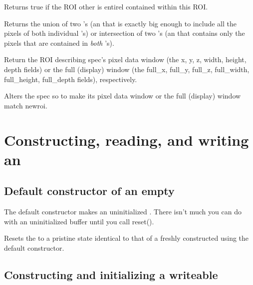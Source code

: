 \NEW %
Returns {\cf true} if the ROI {\cf other} is entirel contained within
this ROI.
\apiend

Returns the union of two \ROI's (an \ROI that is exactly big enough
to include all the pixels of both individual \ROI's) or intersection
of two \ROI's (an \ROI that contains only the pixels that are contained
in \emph{both} \ROI's).
\apiend

Return the ROI describing {\cf spec}'s pixel data window (the {\cf x, y, z,
width, height, depth} fields)
or the full (display) window (the {\cf full_x, full_y, full_z,
full_width, full_height, full_depth} fields), respectively.
\apiend

Alters the {\cf spec} so to make its pixel data window 
or the full (display) window match {\cf newroi}.
\apiend



\section{Constructing, reading, and writing an \ImageBuf}

\subsection*{Default constructor of an empty \ImageBuf}

The default constructor makes an uninitialized \ImageBuf.  There isn't
much you can do with an uninitialized buffer until you call {\cf reset()}.
\apiend

Resets the \ImageBuf to a pristine state identical to that of a freshly
constructed \ImageBuf using the default constructor.
\apiend


\subsection*{Constructing and initializing a writeable \ImageBuf}


